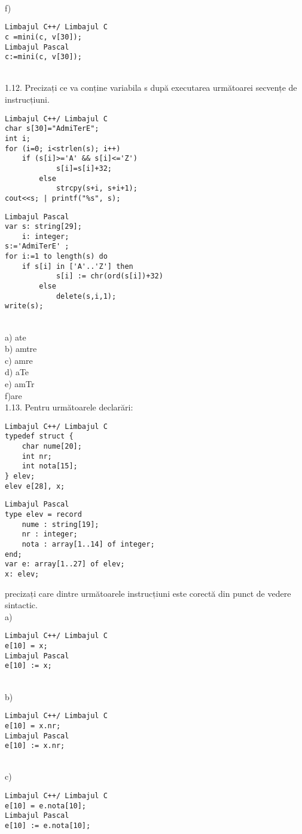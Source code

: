 \\
f) \begin{verbatim}
Limbajul C++/ Limbajul C
c =mini(c, v[30]);
Limbajul Pascal
c:=mini(c, v[30]);
\end{verbatim}
\\
1.12. Precizați ce va conține variabila s după executarea următoarei secvențe de instrucțiuni.
\begin{verbatim}
Limbajul C++/ Limbajul C
char s[30]="AdmiTerE";
int i;
for (i=0; i<strlen(s); i++)
    if (s[i]>='A' && s[i]<='Z')
            s[i]=s[i]+32;
        else
            strcpy(s+i, s+i+1);
cout<<s; | printf("%s", s);
\end{verbatim}
\begin{verbatim}
Limbajul Pascal
var s: string[29];
    i: integer;
s:='AdmiTerE' ;
for i:=1 to length(s) do
    if s[i] in ['A'..'Z'] then
            s[i] := chr(ord(s[i])+32)
        else
            delete(s,i,1);
write(s);
\end{verbatim}
\\
a) ate
\\
b) amtre
\\
c) amre
\\
d) aTe
\\
e) amTr
\\
f)are
\\
1.13. Pentru următoarele declarări:
\begin{verbatim}
Limbajul C++/ Limbajul C
typedef struct {
    char nume[20];
    int nr;
    int nota[15];
} elev;
elev e[28], x;
\end{verbatim}
\begin{verbatim}
Limbajul Pascal
type elev = record
    nume : string[19];
    nr : integer;
    nota : array[1..14] of integer;
end;
var e: array[1..27] of elev;
x: elev;
\end{verbatim}
precizați care dintre următoarele instrucțiuni este corectă din punct de vedere sintactic.
\\
a) \begin{verbatim}
Limbajul C++/ Limbajul C
e[10] = x;
Limbajul Pascal
e[10] := x;
\end{verbatim}
\\
b) \begin{verbatim}
Limbajul C++/ Limbajul C
e[10] = x.nr;
Limbajul Pascal
e[10] := x.nr;
\end{verbatim}
\\
c) \begin{verbatim}
Limbajul C++/ Limbajul C
e[10] = e.nota[10];
Limbajul Pascal
e[10] := e.nota[10];
\end{verbatim}
